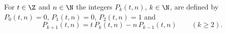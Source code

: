 For $t\in\Z$ and $n\in\N$ the integers $P_k(t,n)$, $k\in\N$, are defined by $P_0(t,n)=0$, $P_1(t,n)=0$, $P_2(t,n)=1$ and
\[
  P_{k+1}(t,n)=t\,P_k(t,n)-n\,P_{k-1}(t,n)\qquad(k\ge2).
\]
